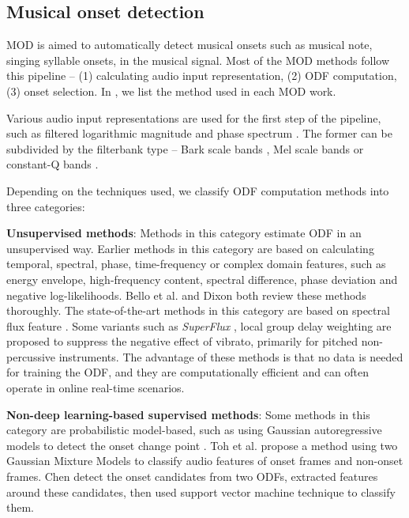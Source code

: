 \subsection{Musical onset detection}

\gls{MOD} is aimed to automatically detect musical onsets such as musical note, singing syllable onsets, in the musical signal. Most of the \gls{MOD} methods follow this pipeline -- (1) calculating audio input representation, (2) \gls{ODF} computation, (3) onset selection. In , we list the method used in each \gls{MOD} work.

Various audio input representations are used for the first step of the pipeline, such as filtered logarithmic magnitude and phase spectrum . The former can be subdivided by the filterbank type -- Bark scale bands , Mel scale bands  or constant-Q bands .

Depending on the techniques used, we classify \gls{ODF} computation methods into three categories:

\noindent\textbf{Unsupervised methods}: Methods in this category estimate \gls{ODF} in an unsupervised way. Earlier methods in this category are based on calculating temporal, spectral, phase, time-frequency or complex domain features, such as energy envelope, high-frequency content, spectral difference, phase deviation and negative log-likelihoods. Bello et al.  and Dixon  both review these methods thoroughly. The state-of-the-art methods in this category are based on spectral flux feature . Some variants such as \textit{SuperFlux} , local group delay weighting  are proposed to suppress the negative effect of vibrato, primarily for pitched non-percussive instruments. The advantage of these methods is that no data is needed for training the \gls{ODF}, and they are computationally efficient and can often operate in online real-time scenarios.

\noindent\textbf{Non-deep learning-based supervised methods}: Some methods in this category are probabilistic model-based, such as using Gaussian autoregressive models to detect the onset change point . Toh et al.  propose a method using two Gaussian Mixture Models to classify audio features of onset frames and non-onset frames. Chen  detect the onset candidates from two \gls{ODF}s, extracted features around these candidates, then used support vector machine technique to classify them.

